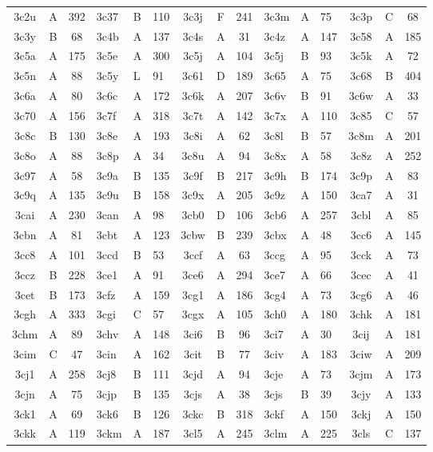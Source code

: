 \begin{longtable}{|c|c|c| a|a|a| c|c|c| a|a|a| c|c|c|}
3c2u & A & 392 & 3c37 & B & 110 & 3c3j & F & 241 & 3c3m & A & 75 & 3c3p & C & 68\\
3c3y & B & 68 & 3c4b & A & 137 & 3c4s & A & 31 & 3c4z & A & 147 & 3c58 & A & 185\\
3c5a & A & 175 & 3c5e & A & 300 & 3c5j & A & 104 & 3c5j & B & 93 & 3c5k & A & 72\\
3c5n & A & 88 & 3c5y & L & 91 & 3c61 & D & 189 & 3c65 & A & 75 & 3c68 & B & 404\\
3c6a & A & 80 & 3c6c & A & 172 & 3c6k & A & 207 & 3c6v & B & 91 & 3c6w & A & 33\\
3c70 & A & 156 & 3c7f & A & 318 & 3c7t & A & 142 & 3c7x & A & 110 & 3c85 & C & 57\\
3c8c & B & 130 & 3c8e & A & 193 & 3c8i & A & 62 & 3c8l & B & 57 & 3c8m & A & 201\\
3c8o & A & 88 & 3c8p & A & 34 & 3c8u & A & 94 & 3c8x & A & 58 & 3c8z & A & 252\\
3c97 & A & 58 & 3c9a & B & 135 & 3c9f & B & 217 & 3c9h & B & 174 & 3c9p & A & 83\\
3c9q & A & 135 & 3c9u & B & 158 & 3c9x & A & 205 & 3c9z & A & 150 & 3ca7 & A & 31\\
3cai & A & 230 & 3can & A & 98 & 3cb0 & D & 106 & 3cb6 & A & 257 & 3cbl & A & 85\\
3cbn & A & 81 & 3cbt & A & 123 & 3cbw & B & 239 & 3cbx & A & 48 & 3cc6 & A & 145\\
3cc8 & A & 101 & 3ccd & B & 53 & 3ccf & A & 63 & 3ccg & A & 95 & 3cck & A & 73\\
3ccz & B & 228 & 3ce1 & A & 91 & 3ce6 & A & 294 & 3ce7 & A & 66 & 3cec & A & 41\\
3cet & B & 173 & 3cfz & A & 159 & 3cg1 & A & 186 & 3cg4 & A & 73 & 3cg6 & A & 46\\
3cgh & A & 333 & 3cgi & C & 57 & 3cgx & A & 105 & 3ch0 & A & 180 & 3chk & A & 181\\
3chm & A & 89 & 3chv & A & 148 & 3ci6 & B & 96 & 3ci7 & A & 30 & 3cij & A & 181\\
3cim & C & 47 & 3cin & A & 162 & 3cit & B & 77 & 3civ & A & 183 & 3ciw & A & 209\\
3cj1 & A & 258 & 3cj8 & B & 111 & 3cjd & A & 94 & 3cje & A & 73 & 3cjm & A & 173\\
3cjn & A & 75 & 3cjp & B & 135 & 3cjs & A & 38 & 3cjs & B & 39 & 3cjy & A & 133\\
3ck1 & A & 69 & 3ck6 & B & 126 & 3ckc & B & 318 & 3ckf & A & 150 & 3ckj & A & 150\\
3ckk & A & 119 & 3ckm & A & 187 & 3cl5 & A & 245 & 3clm & A & 225 & 3cls & C & 137\\

\end{longtable}
